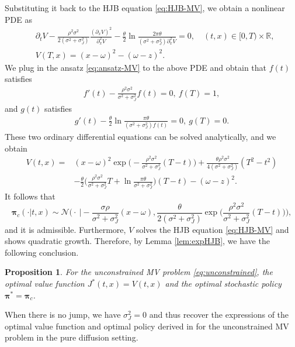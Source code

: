 \documentclass[11pt]{article}
\newtheorem{proposition}{Proposition}
\newcommand{\1}{\mathbbm{1}}
\newcommand{\bpi}{\boldsymbol{\pi}}
\begin{document}
Substituting it back to the HJB equation \eqref{eq:HJB-MV}, we obtain a nonlinear PDE as
\begin{align}
	&\partial_tV - \frac{\rho^2\sigma^2}{2(\sigma^2+\sigma_J^2)}\frac{(\partial_xV)^2}{\partial_x^2V}-\frac{\theta}{2}\ln\frac{2\pi\theta}{(\sigma^2+\sigma_J^2)\partial_x^2V}=0,\quad (t,x)\in[0,T)\times\mathbb{R},\\
	&V(T,x)=(x-\omega)^2-(\omega-z)^2.
\end{align}
We plug in the ansatz \eqref{eq:ansatz-MV} to the above PDE and obtain that $f(t)$ satisfies
\begin{align}
f'(t)-\frac{\rho^2\sigma^2}{\sigma^2+\sigma_J^2}f(t)=0,\ f(T)=1,
\end{align}
and $g(t)$ satisfies
\begin{align}
	g'(t)-\frac{\theta}{2}\ln\frac{\pi\theta}{(\sigma^2+\sigma_J^2)f(t)}=0,\ g(T)=0.
\end{align}
These two ordinary differential equations can be solved analytically, and we obtain
\begin{align}
	V(t,x)=&(x-\omega)^2\exp\bigg(-\frac{\rho^2\sigma^2}{\sigma^2+\sigma_J^2}(T-t)\bigg) + \frac{\theta\rho^2\sigma^2}{4(\sigma^2+\sigma_J^2)}(T^2-t^2)\\
	&-\frac{\theta}{2}\bigg(\frac{\rho^2\sigma^2}{\sigma^2+\sigma_J^2}T+\ln\frac{\pi\theta}{\sigma^2+\sigma_J^2}\bigg)(T-t) - (\omega-z)^2.\label{eq:J-optimal-MV}
\end{align}
It follows that
\begin{equation}\label{eq:policy-optimal-MV}
	\bpi_c(\cdot|t,x)\sim\mathcal{N}\bigg(\cdot\ \Big| -\frac{\sigma\rho}{\sigma^2+\sigma_J^2}(x-\omega), \frac{\theta}{2(\sigma^2+\sigma_J^2)}\exp\bigg(\frac{\rho^2\sigma^2}{\sigma^2+\sigma_J^2}(T-t)\bigg)\bigg),
\end{equation}
and it is admissible. Furthermore, $V$ solves the HJB equation \eqref{eq:HJB-MV} and shows quadratic growth. Therefore, by Lemma \ref{lem:expHJB}, we have the following conclusion.
\begin{proposition}\label{prop:MV-opt}
	For the unconstrained MV problem \eqref{eq:unconstrained}, the optimal value function $J^*(t,x)=V(t,x)$ and the optimal stochastic policy $\bpi^*=\bpi_c$.
\end{proposition}

When there is no jump, we have $\sigma_J^2=0$ and thus recover the expressions of the optimal value function and optimal policy  derived in \cite{wang2020continuous} for the unconstrained MV problem in the pure diffusion setting.
\end{document}
